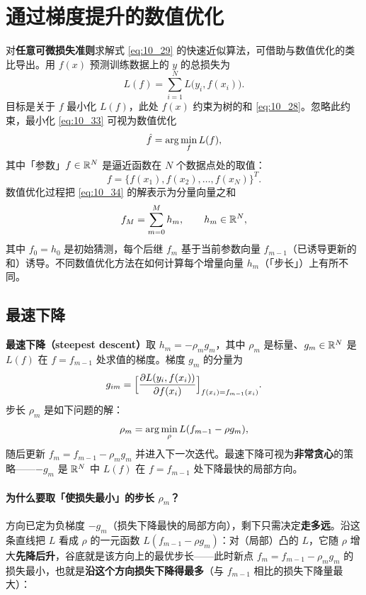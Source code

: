 \section{通过梯度提升的数值优化}

对\textbf{任意可微损失准则}求解式 \eqref{eq:10_29} 的快速近似算法，可借助与数值优化的类比导出。用 $f(x)$ 预测训练数据上的 $y$ 的总损失为
\begin{equation}\label{eq:10_33}
    L(f) = \sum_{i=1}^{N} L\bigl(y_i, f(x_i)\bigr).
\end{equation}
目标是关于 $f$ 最小化 $L(f)$，此处 $f(x)$ 约束为树的和 \eqref{eq:10_28}。忽略此约束，最小化 \eqref{eq:10_33} 可视为数值优化
\begin{equation}\label{eq:10_34}
    \hat f = \arg\min_{f} L(f),
\end{equation}
其中「参数」$f \in \mathbb{R}^N$ 是逼近函数在 $N$ 个数据点处的取值：
\[
    f = \{f(x_1), f(x_2), \ldots, f(x_N)\}^T.
\]
数值优化过程把 \eqref{eq:10_34} 的解表示为分量向量之和
\[
    f_M = \sum_{m=0}^{M} h_m, \qquad h_m \in \mathbb{R}^N,
\]
其中 $f_0 = h_0$ 是初始猜测，每个后继 $f_m$ 基于当前参数向量 $f_{m-1}$（已诱导更新的和）诱导。不同数值优化方法在如何计算每个增量向量 $h_m$（「步长」）上有所不同。

\subsection{最速下降}

\textbf{最速下降（steepest descent）}取 $h_m = -\rho_m g_m$，其中 $\rho_m$ 是标量、$g_m \in \mathbb{R}^N$ 是 $L(f)$ 在 $f = f_{m-1}$ 处求值的梯度。梯度 $g_m$ 的分量为
\begin{equation}\label{eq:10_35}
    g_{im} = \Bigl[\frac{\partial L(y_i, f(x_i))}{\partial f(x_i)}\Bigr]_{f(x_i) = f_{m-1}(x_i)}.
\end{equation}
步长 $\rho_m$ 是如下问题的解：
\begin{equation}\label{eq:10_36}
    \rho_m = \arg\min_{\rho} L(f_{m-1} - \rho g_m),
\end{equation}
随后更新 $f_m = f_{m-1} - \rho_m g_m$ 并进入下一次迭代。最速下降可视为\textbf{非常贪心}的策略——$-g_m$ 是 $\mathbb{R}^N$ 中 $L(f)$ 在 $f = f_{m-1}$ 处下降最快的局部方向。

\paragraph{为什么要取「使损失最小」的步长 $\rho_m$？}

方向已定为负梯度 $-g_m$（损失下降最快的局部方向），剩下只需决定\textbf{走多远}。沿这条直线把 $L$ 看成 $\rho$ 的一元函数 $L(f_{m-1} - \rho g_m)$：对（局部）凸的 $L$，它随 $\rho$ 增大\textbf{先降后升}，谷底就是该方向上的最优步长——此时新点 $f_m = f_{m-1} - \rho_m g_m$ 的损失最小，也就是\textbf{沿这个方向损失下降得最多}（与 $f_{m-1}$ 相比的损失下降量最大）：

